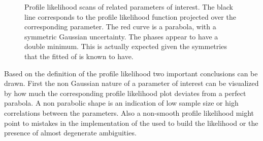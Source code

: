 \begin{figure}[!t]
  \centering
  \begin{subfigure}{0.5\textwidth}
    \raggedright
    \scalebox{0.54}{}
    \caption{}
    \label{nll_f0}
  \end{subfigure}%
  \hfill%
  \begin{subfigure}{0.5\textwidth}
    \raggedleft
    \scalebox{0.54}{}
    \caption{}
    \label{nll_fpar}
  \end{subfigure}
  \begin{subfigure}{0.5\textwidth}
    \raggedright
    \scalebox{0.54}{}
    \caption{}
    \label{nll_AparPhase}
  \end{subfigure}%
  \hfill%
  \begin{subfigure}{0.5\textwidth}
    \raggedleft
    \scalebox{0.54}{}
    \caption{}
    \label{nll_AperpPhase}
  \end{subfigure}
\caption{Profile likelihood scans of \pwave related parameters of interest. The black line corresponds to the profile likelihood
         function projected over the corresponding parameter. The red curve is a parabola, with a symmetric Gaussian
         uncertainty. The phases appear to have a double minimum. This is actually expected given the symmetries that the fitted \pdf
         of  is known to have.}
\end{figure}

Based on the definition of the profile likelihood two important conclusions can be drawn. First the non
Gaussian nature of a parameter of interest can be visualized by how much the corresponding profile likelihood plot deviates from
a perfect parabola. A non parabolic shape is an indication of low sample size or high correlations between the parameters.
Also a non-smooth profile likelihood might point to mistakes in the implementation of the \pdf used to build the likelihood
or the presence of almost degenerate ambiguities.

